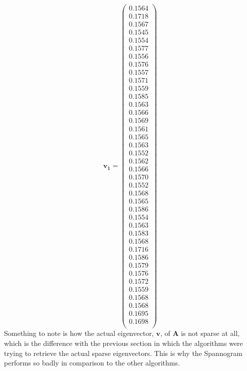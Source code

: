 \documentclass[11pt,a4paper]{article}
\newcommand{\covmat}{\mathbf{A}}
\begin{document}
\begin{equation*}
\mathbf{\mathbf{v}_1}=
\begin{pmatrix}
0.1564\\
0.1718\\
0.1567\\
0.1545\\
0.1554\\
0.1577\\
0.1556\\
0.1576\\
0.1557\\
0.1571\\
0.1559\\
0.1585\\
0.1563\\
0.1566\\
0.1569\\
0.1561\\
0.1565\\
0.1563\\
0.1552\\
0.1562\\
0.1566\\
0.1570\\
0.1552\\
0.1568\\
0.1565\\
0.1586\\
0.1554\\
0.1563\\
0.1583\\
0.1568\\
0.1716\\
0.1586\\
0.1579\\
0.1576\\
0.1572\\
0.1559\\
0.1568\\
0.1568\\
0.1695\\
0.1698\\
\end{pmatrix}
\end{equation*}
Something to note is how the actual eigenvector, $\mathbf{v}$, of $\covmat$ is not sparse at all, which is the difference with the previous section in which the algorithms were trying to retrieve the actual sparse eigenvectors. This is why the Spannogram performs so badly in comparison to the other algorithms. 

\end{document}
